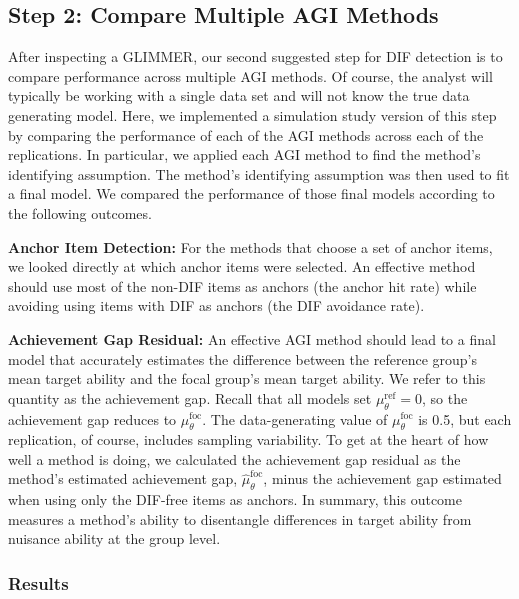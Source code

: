 \documentclass[
  english,
  man,floatsintext]{apa6}
\begin{document}
\hypertarget{step-2-compare-multiple-agi-methods}{%
\subsection{Step 2: Compare Multiple AGI Methods}\label{step-2-compare-multiple-agi-methods}}

After inspecting a GLIMMER, our second suggested step for DIF detection is to compare performance across multiple AGI methods. Of course, the analyst will typically be working with a single data set and will not know the true data generating model. Here, we implemented a simulation study version of this step by comparing the performance of each of the AGI methods across each of the replications. In particular, we applied each AGI method to find the method's identifying assumption. The method's identifying assumption was then used to fit a final model. We compared the performance of those final models according to the following outcomes.

\textbf{Anchor Item Detection:} For the methods that choose a set of anchor items, we looked directly at which anchor items were selected. An effective method should use most of the non-DIF items as anchors (the anchor hit rate) while avoiding using items with DIF as anchors (the DIF avoidance rate).

\textbf{Achievement Gap Residual:} An effective AGI method should lead to a final model that accurately estimates the difference between the reference group's mean target ability and the focal group's mean target ability. We refer to this quantity as the achievement gap. Recall that all models set \(\mu_\theta^\text{ref} = 0\), so the achievement gap reduces to \(\mu_\theta^\text{foc}\). The data-generating value of \(\mu_\theta^\text{foc}\) is 0.5, but each replication, of course, includes sampling variability. To get at the heart of how well a method is doing, we calculated the achievement gap residual as the method's estimated achievement gap, \(\hat\mu_\theta^\text{foc}\), minus the achievement gap estimated when using only the DIF-free items as anchors. In summary, this outcome measures a method's ability to disentangle differences in target ability from nuisance ability at the group level.

\hypertarget{results}{%
\subsubsection{Results}\label{results}}
\end{document}

